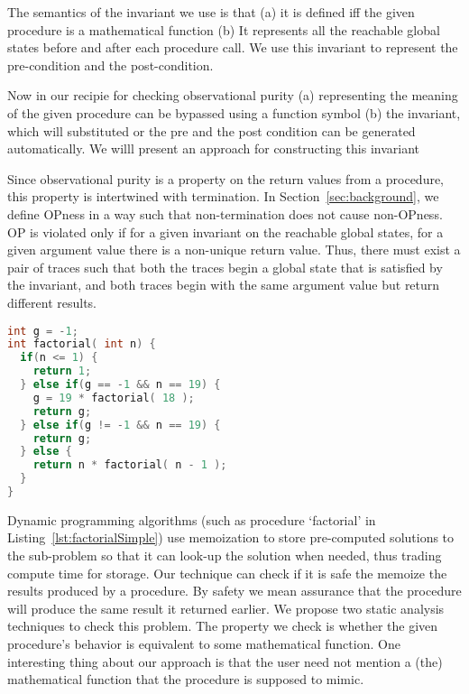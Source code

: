 \documentclass{llncs}
\begin{document}
The semantics of the invariant we use is that (a) it is defined iff
the given procedure is a mathematical function (b) It represents all
the reachable global states before and after each procedure call. We
use this invariant to represent the pre-condition and the
post-condition. 

Now in our recipie for checking observational purity (a) representing the
meaning of the given procedure can be bypassed using a function symbol
(b) the invariant, which will substituted or the pre and the post
condition can be generated automatically. We willl present an approach
for constructing this invariant
  



Since observational purity is a property on the return values from a
procedure, this property is intertwined with termination. In
Section~\ref{sec:background}, we define OPness in a way such that
non-termination does not cause non-OPness. OP is violated only if for
a given invariant on the reachable global states, for a given argument
value there is a non-unique return value. Thus, there must exist a
pair of traces such that both the traces begin a global state that is
satisfied by the invariant, and both traces begin with the same
argument value but return different results.


\begin{lstlisting}[language=c, caption= {Procedure `factorial' :
      returns factorial of `n' and memoizes result for argument value
      `19'.}, label=lst:factorialSimple]
int g = -1;
int factorial( int n) {
  if(n <= 1) {
    return 1;
  } else if(g == -1 && n == 19) {
    g = 19 * factorial( 18 );
    return g;
  } else if(g != -1 && n == 19) {
    return g;
  } else {
    return n * factorial( n - 1 );
  }
}
\end{lstlisting}


Dynamic programming algorithms (such as procedure `factorial' in
Listing~\ref{lst:factorialSimple}) use memoization to store
pre-computed solutions to the sub-problem so that it can look-up the
solution when needed, thus trading compute time for storage. Our
technique can check if it is safe the memoize the results produced by
a procedure. By safety we mean assurance that the procedure will
produce the same result it returned earlier. We propose two static
analysis techniques to check this problem. The property we check is
whether the given procedure's behavior is equivalent to some
mathematical function.  One interesting thing about our approach is
that the user need not mention a (the) mathematical function that the
procedure is supposed to mimic.
\end{document}
